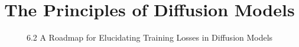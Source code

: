 ﻿%

\graphicspath{{../images/}}
\title{The Principles of Diffusion Models}
\subtitle{6.2 A Roadmap for Elucidating Training Losses in Diffusion Models}


\begin{frame}
    \titlepage
\end{frame}



